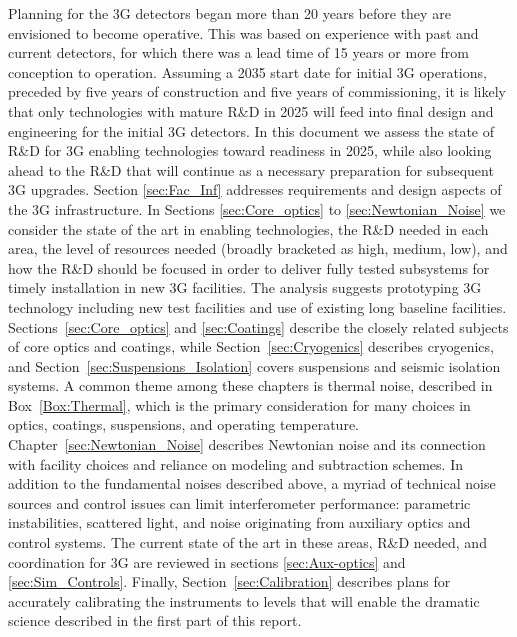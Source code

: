 Planning for the 3G detectors began more than 20 years before they are envisioned to become operative. 
This was based on experience with past and current detectors, for which there was a lead time of 15 years or more from conception to operation. 
Assuming a 2035 start date for initial 3G operations, preceded by five years of construction and five years of commissioning, it is likely that only technologies with mature R\&D in 2025 will feed into final design and engineering for the initial 3G detectors. In this document we assess the state of R\&D for 3G enabling technologies toward readiness in 2025, while also looking ahead to the R\&D that will continue as a necessary preparation for subsequent 3G upgrades. 
Section \ref{sec:Fac_Inf} addresses requirements and design aspects of the 3G infrastructure.
In Sections \ref{sec:Core_optics} to \ref{sec:Newtonian_Noise} we consider the state of the art in enabling technologies, the R\&D needed in each area, the level of resources needed (broadly bracketed as high, medium, low), and how the R\&D should be focused in order to deliver fully tested subsystems for timely installation in new 3G facilities. 
The analysis suggests prototyping 3G technology including new test facilities and use of existing long baseline facilities. 
Sections~\ref{sec:Core_optics} and \ref{sec:Coatings} describe the closely related subjects of core optics and coatings, while Section~\ref{sec:Cryogenics} describes cryogenics, and Section~\ref{sec:Suspensions_Isolation} covers suspensions and seismic isolation systems.
A common theme among these chapters is thermal noise, described in Box~\ref{Box:Thermal}, which is the primary consideration for many choices in optics, coatings, suspensions, and operating temperature. 
Chapter~\ref{sec:Newtonian_Noise} describes Newtonian noise and its connection with facility choices and reliance on modeling and subtraction schemes. 
In addition to the fundamental noises described above, a myriad of technical noise sources and control issues can limit interferometer performance: parametric instabilities, scattered light, and noise originating from auxiliary optics and control systems. 
The current state of the art in these areas, R\&D needed, and coordination for 3G are reviewed in sections \ref{sec:Aux-optics} and \ref{sec:Sim_Controls}. 
Finally, Section~\ref{sec:Calibration} describes plans for accurately calibrating the instruments to levels that will enable the dramatic science described in the first part of this report. 

